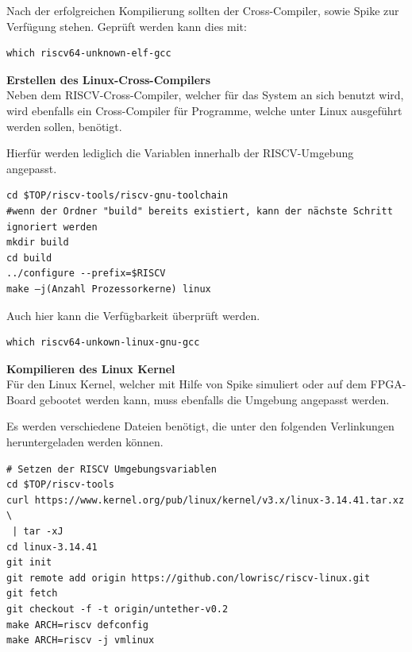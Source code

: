 Nach der erfolgreichen Kompilierung sollten der Cross-Compiler, sowie Spike zur Verfügung stehen. Geprüft werden kann dies mit:\\

\begin{lstlisting}[caption={Überprüfung der Erreichbarkeit des Compilers},label={code:elfgcc}]
which riscv64-unknown-elf-gcc
\end{lstlisting}


\vspace{5mm}
\textbf{Erstellen des Linux-Cross-Compilers}\\

Neben dem RISCV-Cross-Compiler, welcher für das System an sich benutzt wird, wird ebenfalls ein Cross-Compiler für Programme, welche unter Linux ausgeführt werden sollen, benötigt.

Hierfür werden lediglich die Variablen innerhalb der RISCV-Umgebung angepasst.\\

\begin{lstlisting}[caption={Anpassung der RISCV-Umgebung},label={code:riscvumgebung},extendedchars=false]
cd $TOP/riscv-tools/riscv-gnu-toolchain
#wenn der Ordner "build" bereits existiert, kann der nächste Schritt ignoriert werden
mkdir build
cd build
../configure --prefix=$RISCV
make –j(Anzahl Prozessorkerne) linux
\end{lstlisting}

\newpage
Auch hier kann die Verfügbarkeit überprüft werden.\\

\begin{lstlisting}[caption={Überprüfung der Erreichbarkeit des Linux-Compilers},label={code:linuxgcc}]
which riscv64-unkown-linux-gnu-gcc
\end{lstlisting}

\vspace{5mm}

 \textbf{Kompilieren des Linux Kernel}\\

Für den Linux Kernel, welcher mit Hilfe von Spike simuliert oder auf dem FPGA-Board gebootet werden kann, muss ebenfalls die Umgebung angepasst werden.

Es werden verschiedene Dateien benötigt, die unter den folgenden Verlinkungen heruntergeladen werden können.\\

\begin{lstlisting}[caption={Download und Anpassung des Kernels},label={code:kernelkonf}]
# Setzen der RISCV Umgebungsvariablen
cd $TOP/riscv-tools
curl https://www.kernel.org/pub/linux/kernel/v3.x/linux-3.14.41.tar.xz \
 | tar -xJ
cd linux-3.14.41
git init
git remote add origin https://github.con/lowrisc/riscv-linux.git
git fetch
git checkout -f -t origin/untether-v0.2
make ARCH=riscv defconfig
make ARCH=riscv -j vmlinux
\end{lstlisting}

